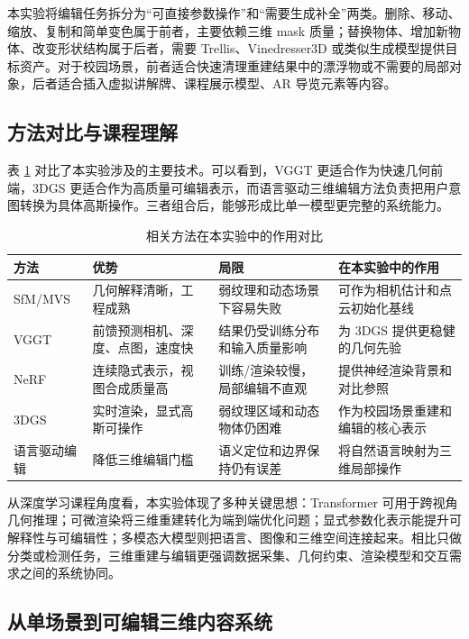 \documentclass[12pt, a4paper]{article}
\begin{document}
本实验将编辑任务拆分为“可直接参数操作”和“需要生成补全”两类。删除、移动、缩放、复制和简单变色属于前者，主要依赖三维 mask 质量；替换物体、增加新物体、改变形状结构属于后者，需要 Trellis、Vinedresser3D 或类似生成模型提供目标资产。对于校园场景，前者适合快速清理重建结果中的漂浮物或不需要的局部对象，后者适合插入虚拟讲解牌、课程展示模型、AR 导览元素等内容。

\subsection{方法对比与课程理解}

表 \ref{tab:method-comparison} 对比了本实验涉及的主要技术。可以看到，VGGT 更适合作为快速几何前端，3DGS 更适合作为高质量可编辑表示，而语言驱动三维编辑方法负责把用户意图转换为具体高斯操作。三者组合后，能够形成比单一模型更完整的系统能力。

\begin{table}[H]
  \centering
  \caption{相关方法在本实验中的作用对比}
  \label{tab:method-comparison}
  \begin{tabularx}{\linewidth}{p{2.5cm} p{3.1cm} p{3.1cm} X}
    \toprule
    \textbf{方法} & \textbf{优势} & \textbf{局限} & \textbf{在本实验中的作用} \\
    \midrule
    SfM/MVS & 几何解释清晰，工程成熟 & 弱纹理和动态场景下容易失败 & 可作为相机估计和点云初始化基线 \\
    VGGT & 前馈预测相机、深度、点图，速度快 & 结果仍受训练分布和输入质量影响 & 为 3DGS 提供更稳健的几何先验 \\
    NeRF & 连续隐式表示，视图合成质量高 & 训练/渲染较慢，局部编辑不直观 & 提供神经渲染背景和对比参照 \\
    3DGS & 实时渲染，显式高斯可操作 & 弱纹理区域和动态物体仍困难 & 作为校园场景重建和编辑的核心表示 \\
    语言驱动编辑 & 降低三维编辑门槛 & 语义定位和边界保持仍有误差 & 将自然语言映射为三维局部操作 \\
    \bottomrule
  \end{tabularx}
\end{table}

从深度学习课程角度看，本实验体现了多种关键思想：Transformer 可用于跨视角几何推理；可微渲染将三维重建转化为端到端优化问题；显式参数化表示能提升可解释性与可编辑性；多模态大模型则把语言、图像和三维空间连接起来。相比只做分类或检测任务，三维重建与编辑更强调数据采集、几何约束、渲染模型和交互需求之间的系统协同。

\subsection{从单场景到可编辑三维内容系统}
\end{document}
